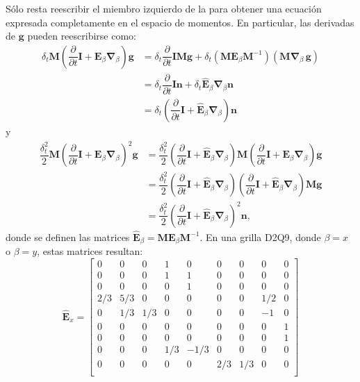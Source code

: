 S\'olo resta reescribir el miembro izquierdo de la  para obtener una ecuaci\'on expresada completamente en el espacio de momentos. En particular, las derivadas de $\bm{g}$ pueden reescribirse como:
\begin{equation}
	\begin{aligned}
		\delta_t \bm{M}\left( \dfrac{\partial}{\partial t} \bm{I} + \bm{E}_{\beta}\bm{\nabla}_{\beta} \right) \bm{g} &= \delta_t \dfrac{\partial}{\partial t}\bm{IMg} + \delta_t ( \bm{M} \bm{E}_{\beta} \bm{M}^{-1} )( \bm{M} \bm{\nabla}_{\beta} \, \bm{g}) \\
		&= \delta_t \dfrac{\partial}{\partial t}\bm{In} + \delta_t \hat{\bm{E}}_{\beta} \bm{\nabla}_{\beta} \bm{n} \\
		&= \delta_t\left( \dfrac{\partial}{\partial t}\bm{I} + \hat{\bm{E}}_{\beta} \bm{\nabla}_{\beta} \right) \bm{n}
	\end{aligned}
	\label{eq:M_propag_1}
\end{equation}
y
\begin{equation}
	\begin{aligned}
		\dfrac{\delta^2_t}{2} \bm{M}\left( \dfrac{\partial}{\partial t} \bm{I} + \bm{E}_{\beta}\bm{\nabla}_{\beta} \right)^2 \bm{g} 
		&= \dfrac{\delta^2_t}{2} \left( \dfrac{\partial}{\partial t}\bm{I} + \hat{\bm{E}}_{\beta} \bm{\nabla}_{\beta} \right) \bm{M} \left( \dfrac{\partial}{\partial t}\bm{I} + \bm{E}_{\beta} \bm{\nabla}_{\beta} \right) \bm{g} \\
		&= \dfrac{\delta^2_t}{2} \left( \dfrac{\partial}{\partial t}\bm{I} + \hat{\bm{E}}_{\beta} \bm{\nabla}_{\beta} \right) \left( \dfrac{\partial}{\partial t}\bm{I} + \hat{\bm{E}}_{\beta} \bm{\nabla}_{\beta} \right) \bm{Mg} \\
		&= \dfrac{\delta^2_t}{2} \left( \dfrac{\partial}{\partial t}\bm{I} + \hat{\bm{E}}_{\beta} \bm{\nabla}_{\beta} \right)^2 \bm{n},
	\end{aligned}
	\label{eq:M_propag_2}
\end{equation}
donde se definen las matrices $\hat{\bm{E}}_{\beta} = \bm{M} \bm{E}_{\beta} \bm{M}^{-1}$. En una grilla D2Q9, donde $\beta=x$ o $\beta=y$, estas matrices resultan:
\begin{equation}
	\hat{\bm{E}}_{x}=
	\begin{bmatrix}
	0 & 0 & 0 & 1 & 0 & 0 & 0 & 0 & 0 \\
	0 & 0 & 0 & 1 & 1 & 0 & 0 & 0 & 0 \\
	0 & 0 & 0 & 0 & 1 & 0 & 0 & 0 & 0 \\
	2/3 & 5/3 & 0 & 0 & 0 & 0 & 0 & 1/2 & 0 \\
	0 & 1/3 & 1/3 & 0 & 0 & 0 & 0 & -1 & 0 \\
	0 & 0 & 0 & 0 & 0 & 0 & 0 & 0 & 1 \\
	0 & 0 & 0 & 0 & 0 & 0 & 0 & 0 & 1 \\
	0 & 0 & 0 & 1/3 & -1/3 & 0 & 0 & 0 & 0 \\
	0 & 0 & 0 & 0 & 0 & 2/3 & 1/3 & 0 & 0 \\
	\end{bmatrix}
\end{equation} 

